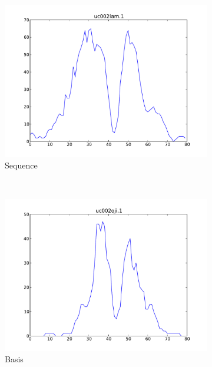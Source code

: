 \documentclass[parskip]{cs4rep}
\begin{document}
\begin{figure}[t,b]
   \centering
   \begin{subfigure}[b]{0.31\textwidth}
       \centering
       \includegraphics[width=\textwidth]{figures/DTW/sequence.pdf}
       \caption{Sequence}
       \label{fig:DTW:projection:sequence}
   \end{subfigure}
   ~
   \begin{subfigure}[b]{0.31\textwidth}
       \centering
       \includegraphics[width=\textwidth]{figures/DTW/basis.pdf}
       \caption{Basis}
       \label{fig:DTW:projection:basis}
   \end{subfigure}
   ~
   \begin{subfigure}[b]{0.31\textwidth}

\end{subfigure}
\end{figure}
\end{document}
